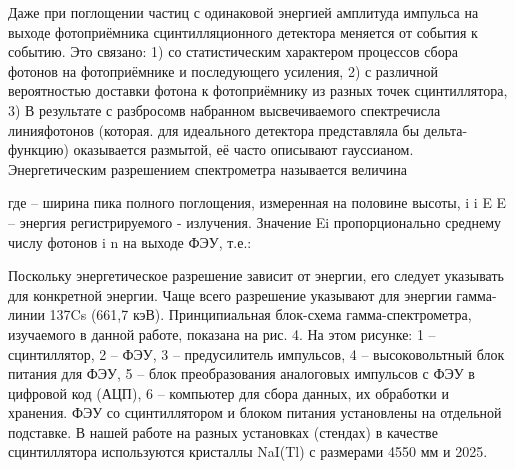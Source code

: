 Даже при поглощении частиц с одинаковой энергией амплитуда импульса на выходе
фотоприёмника сцинтилляционного детектора меняется от события к событию. Это
связано: 1) со статистическим характером процессов сбора фотонов на
фотоприёмнике и последующего усиления, 2) с различной вероятностью доставки
фотона к фотоприёмнику из разных точек сцинтиллятора, 3) В результате с
разбросомв набранном высвечиваемого спектречисла линияфотонов (которая. для
идеального детектора представляла бы дельта-функцию) оказывается размытой, её
часто описывают гауссианом. Энергетическим разрешением спектрометра называется
величина

где – ширина пика полного поглощения, измеренная на половине высоты, i i E E –
энергия регистрируемого  - излучения. Значение Ei пропорционально среднему
числу фотонов i n на выходе ФЭУ, т.е.:

Поскольку энергетическое разрешение зависит от энергии, его следует указывать
для конкретной энергии. Чаще всего разрешение указывают для энергии гамма-линии
137Cs (661,7 кэВ). Принципиальная блок-схема гамма-спектрометра, изучаемого в
данной работе, показана на рис. 4. На этом рисунке: 1 – сцинтиллятор, 2 – ФЭУ, 3
– предусилитель импульсов, 4 – высоковольтный блок питания для ФЭУ, 5 – блок
преобразования аналоговых импульсов с ФЭУ в цифровой код (АЦП), 6 – компьютер
для сбора данных, их обработки и хранения. ФЭУ со сцинтиллятором и блоком
питания установлены на отдельной подставке. В нашей работе на разных установках
(стендах) в качестве сцинтиллятора используются кристаллы NaI(Tl) с размерами
4550 мм и  2025.
